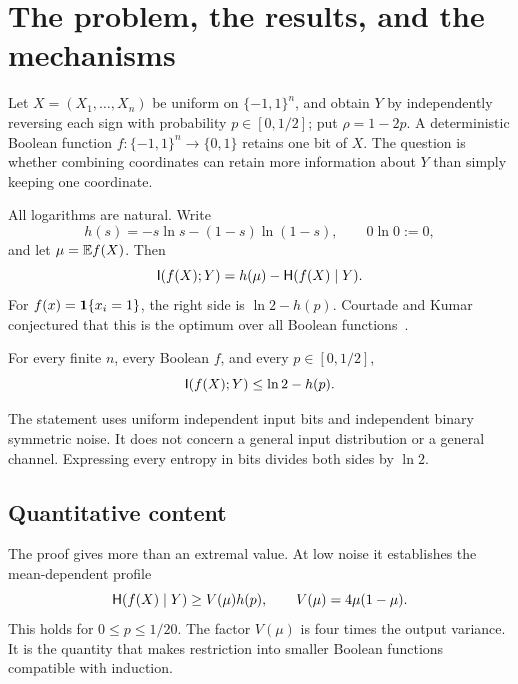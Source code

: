 \section{The problem, the results, and the mechanisms}\label{sec:question}
Let $X=(X_1,\ldots,X_n)$ be uniform on $\{-1,1\}^n$, and obtain $Y$ by independently reversing each sign with probability $p\in[0,1/2]$; put $\rho=1-2p$. A deterministic Boolean function $f:\{-1,1\}^n\to\{0,1\}$ retains one bit of $X$. The question is whether combining coordinates can retain more information about $Y$ than simply keeping one coordinate.

All logarithms are natural. Write
\[
 h(s)=-s\ln s-(1-s)\ln(1-s),\qquad 0\ln0:=0,
\]
and let $\mu=\mathbb E f(X)$. Then
\begin{equation}\label{eq:information}
\mathsf I(f(X);Y)=h(\mu)-\mathsf H(f(X)\mid Y).
\end{equation}
For $f(x)=\mathbf 1\{x_i=1\}$, the right side is $\ln2-h(p)$. Courtade and Kumar conjectured that this is the optimum over all Boolean functions~\cite{CK}.

\begin{theorem}\label{thm:main}
For every finite $n$, every Boolean $f$, and every $p\in[0,1/2]$,
\begin{equation}\label{eq:target}
\mathsf I(f(X);Y)\le\ln2-h(p).
\end{equation}
\end{theorem}
The statement uses uniform independent input bits and independent binary symmetric noise. It does not concern a general input distribution or a general channel. Expressing every entropy in bits divides both sides by $\ln2$.

\subsection{Quantitative content}
The proof gives more than an extremal value. At low noise it establishes the mean-dependent profile
\begin{equation}\label{eq:profile}
\mathsf H(f(X)\mid Y)\ge V(\mu)h(p),\qquad V(\mu)=4\mu(1-\mu).
\end{equation}
This holds for $0\le p\le1/20$. The factor $V(\mu)$ is four times the output variance. It is the quantity that makes restriction into smaller Boolean functions compatible with induction.


